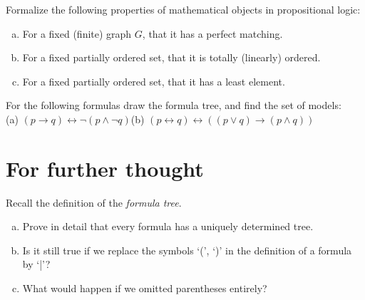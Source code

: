 \begin{problem}

    Formalize the following properties of mathematical objects in propositional logic:
    \begin{enumerate}[(a)]
        \item For a fixed (finite) graph $G$, that it has a perfect matching.
        \item For a fixed partially ordered set, that it is totally (linearly) ordered.
        \item For a fixed partially ordered set, that it has a least element.
    \end{enumerate}

\end{problem}


\begin{problem} 
    
    For the following formulas draw the formula tree, and find the set of models: \\(a) $(p \to q) \leftrightarrow \neg (p \wedge \neg q)$\qquad (b) $(p \leftrightarrow q) \leftrightarrow ((p \vee q) \to (p \wedge q))$

\end{problem}



\section*{For further thought}


\begin{problem}

    Recall the definition of the \emph{formula tree}.
    \begin{enumerate}[(a)]
        \item Prove in detail that every formula has a uniquely determined tree.
        \item Is it still true if we replace the symbols `(', `)' in the definition of a formula by `|'?
        \item What would happen if we omitted parentheses entirely?
    \end{enumerate}

\end{problem}
